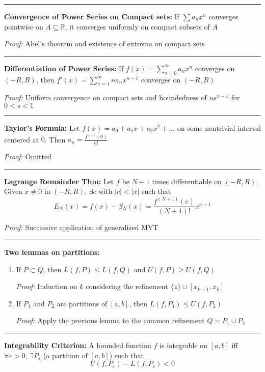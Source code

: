\documentclass[12pt]{article}
\newcommand{\R}{\mathbb{R}}
\newcommand{\abs}[1]{\left\vert #1 \right\vert}
\newcommand{\ep}{\varepsilon}
\renewcommand{\hline}{\vspace*{10pt} \hrule \vspace*{10pt}}
\begin{document}
    \hline 

    \textbf{Convergence of Power Series on Compact sets:} If $\sum a_n x^n$ converges pointwise on $A \subseteq \R$, it converges uniformly on compact subsets of $A$

        \emph{Proof:} Abel's theorem and existence of extrema on compact sets 

    \hline 

    \textbf{Differentiation of Power Series:} If $f(x) = \sum_{n=0}^{\infty} a_nx^n$ converges on $(-R, R)$, then $f'(x) = \sum_{n=1}^{\infty} na_n x^{n-1}$ converges on $(-R, R)$

        \emph{Proof:} Uniform convergence on compact sets and boundedness of $ns^{n-1}$ for $0 < s < 1$

    \hline

    \textbf{Taylor's Formula:} Let $f(x) = a_0 + a_1 x + a_2 x^2 + \dots$ on some nontrivial interval centered at $0$. Then $a_n = \frac{f^{(n)}(0)}{n!}$

        \emph{Proof:} Omitted

    \hline 

    \textbf{Lagrange Remainder Thm:} Let $f$ be $N + 1$ times differentiable on $(-R, R)$. Given $x \neq 0$ in $(-R, R)$, $\exists c$ with $\abs{c} < \abs{x}$ such that
    \[E_N(x) = f(x) - S_N(x) = \frac{f^{(N+1)}(c)}{(N+1)!} x^{n+1}\]

        \emph{Proof:} Successive application of generalized MVT

    \hline

    \textbf{Two lemmas on partitions:} 
    \begin{enumerate}
        \item If $P\subset Q$, then $L(f, P) \leq L(f, Q)$ and $U(f, P) \geq U(f, Q)$ 
        
        \emph{Proof:} Induction on $k$ considering the refinement $\{z\} \cup [x_{k-1}, x_k]$ 

        \item If $P_1$ and $P_2$ are partitions of $[a, b]$, then $L(f, P_1) \leq U(f, P_2)$
        
        \emph{Proof:} Apply the previous lemma to the common refinement $Q = P_1 \cup P_2$
    \end{enumerate}

    \hline

    \textbf{Integrability Criterion:} A bounded function $f$ is integrable on $[a, b]$ iff $\forall \ep > 0$, $\exists P_{\ep}$ (a partition of $[a, b]$) such that 
    \[U(f, P_{\ep}) - L(f, P_{\ep}) < 0\] 
\end{document}
